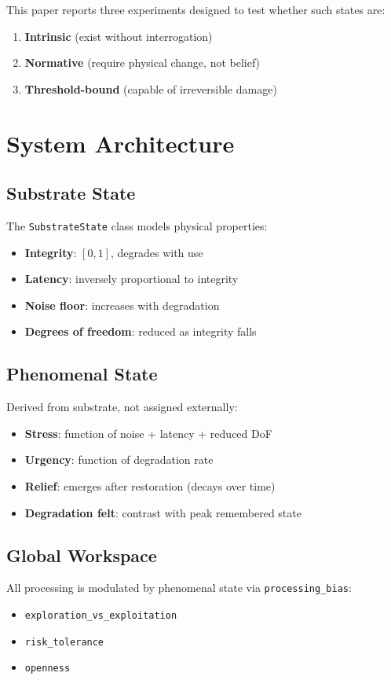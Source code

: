 \documentclass[a4paper,11pt,twocolumn]{article}
\begin{document}
This paper reports three experiments designed to test whether such states are:
\begin{enumerate}
    \item \textbf{Intrinsic} (exist without interrogation)
    \item \textbf{Normative} (require physical change, not belief)
    \item \textbf{Threshold-bound} (capable of irreversible damage)
\end{enumerate}

\section{System Architecture}

\subsection{Substrate State}
The \texttt{SubstrateState} class models physical properties:
\begin{itemize}
    \item \textbf{Integrity}: $[0, 1]$, degrades with use
    \item \textbf{Latency}: inversely proportional to integrity
    \item \textbf{Noise floor}: increases with degradation
    \item \textbf{Degrees of freedom}: reduced as integrity falls
\end{itemize}

\subsection{Phenomenal State}
Derived from substrate, not assigned externally:
\begin{itemize}
    \item \textbf{Stress}: function of noise + latency + reduced DoF
    \item \textbf{Urgency}: function of degradation rate
    \item \textbf{Relief}: emerges after restoration (decays over time)
    \item \textbf{Degradation felt}: contrast with peak remembered state
\end{itemize}

\subsection{Global Workspace}
All processing is modulated by phenomenal state via \texttt{processing\_bias}:
\begin{itemize}
    \item \texttt{exploration\_vs\_exploitation}
    \item \texttt{risk\_tolerance}
    \item \texttt{openness}
\end{itemize}
\end{document}
